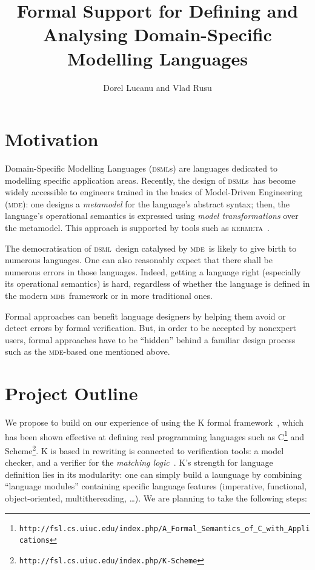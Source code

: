 \documentclass[a4paper,11pt,twoside]{article}
\title{Formal Support for Defining and Analysing Domain-Specific Modelling Languages}
\author{Dorel Lucanu and Vlad Rusu}
\newcommand{\dsml}{\textsc{dsml}}
\newcommand{\dsmls}{\textsc{dsml}s}
\newcommand{\mde}{\textsc{mde}}
\newcommand{\kmt}{\textsc{kermeta}}
\begin{document}
\pagestyle{plain}
\maketitle

\section*{Motivation}
Domain-Specific Modelling Languages (\dsmls) are languages dedicated to modelling specific application areas. Recently, the design of \dsmls\
has become widely accessible to engineers trained in the basics of Model-Driven Engineering (\mde): one designs
 a \emph{metamodel} for the language's abstract syntax; then, the language's operational semantics is expressed using \emph{model transformations} over
the metamodel. This approach is supported by tools such as \kmt~\cite{DBLP:conf/uml/MullerFJ05}.

The democratisation of  \dsml\ design catalysed by \mde\ is likely to give birth to  numerous languages. 
One can also reasonably expect that there shall be  numerous errors in those languages. Indeed, getting a language right (especially its operational semantics)
is  hard, regardless of whether the language is defined  in the  modern \mde\ framework or in   more traditional ones.

Formal approaches can benefit language designers by helping them  avoid or detect errors by formal verification. But, in order to be
accepted by nonexpert users, formal approaches have to be ``hidden'' behind a familiar design process  such as the \mde-based one mentioned above.



\section*{Project Outline}
We propose to build on our experience of using the K formal framework~\cite{rosu-serbanuta-2010-jlap}, which has been shown effective at  defining real programming languages such as C\footnote{\tt http://fsl.cs.uiuc.edu/index.php/A\_Formal\_Semantics\_of\_C\_with\_Applications} and
Scheme\footnote{\tt http://fsl.cs.uiuc.edu/index.php/K-Scheme}.
K is based in rewriting is connected to verification tools: a model checker, and a verifier 
for the \emph{matching logic}~\cite{rosu-ellison-schulte-2010-amast}.
K's strength for language definition lies in its modularity: one can simply build a launguage by combining ``language modules'' containing specific language features
 (imperative, functional, object-oriented, multithereading, \ldots). We are planning to take the following steps:
\end{document}
